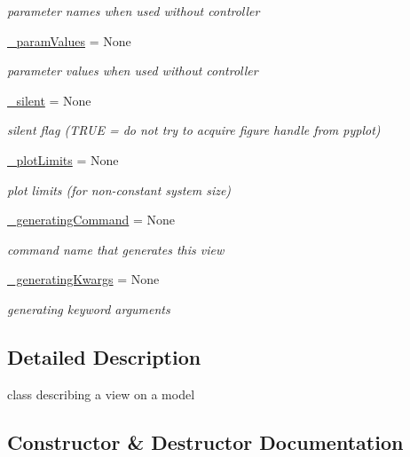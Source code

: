 \begin{DoxyCompactItemize}
\begin{DoxyCompactList}\small\item\em parameter names when used without controller \end{DoxyCompactList}\item 
\hyperlink{class_mu_mo_t_1_1_mu_mo_t_1_1_mu_mo_tview_a04608181fa27d9aad4983d3694f7ab17}{\+\_\+param\+Values} = None
\begin{DoxyCompactList}\small\item\em parameter values when used without controller \end{DoxyCompactList}\item 
\hyperlink{class_mu_mo_t_1_1_mu_mo_t_1_1_mu_mo_tview_a909146a3c119c927727c7d533042b184}{\+\_\+silent} = None
\begin{DoxyCompactList}\small\item\em silent flag (T\+R\+UE = do not try to acquire figure handle from pyplot) \end{DoxyCompactList}\item 
\hyperlink{class_mu_mo_t_1_1_mu_mo_t_1_1_mu_mo_tview_a590db9d889a22b57be41475d83d4d453}{\+\_\+plot\+Limits} = None
\begin{DoxyCompactList}\small\item\em plot limits (for non-\/constant system size) \end{DoxyCompactList}\item 
\hyperlink{class_mu_mo_t_1_1_mu_mo_t_1_1_mu_mo_tview_ace48ed03490093d8f44cde91e2f1e86e}{\+\_\+generating\+Command} = None
\begin{DoxyCompactList}\small\item\em command name that generates this view \end{DoxyCompactList}\item 
\hyperlink{class_mu_mo_t_1_1_mu_mo_t_1_1_mu_mo_tview_ad99375c41fba0adf5336e94457427ab2}{\+\_\+generating\+Kwargs} = None
\begin{DoxyCompactList}\small\item\em generating keyword arguments \end{DoxyCompactList}\end{DoxyCompactItemize}


\subsection{Detailed Description}
class describing a view on a model 

\subsection{Constructor \& Destructor Documentation}
\mbox{\label{class_mu_mo_t_1_1_mu_mo_t_1_1_mu_mo_tview_a367325b3bd7ca4a7b7ec4107f9aa6a16}} 
